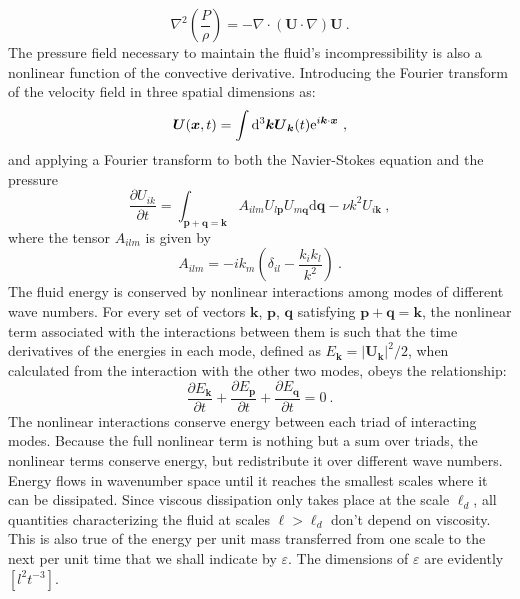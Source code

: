 \documentclass[12pt,a4paper]{article}
\renewcommand{\vec}[1]{\boldsymbol{#1}}
\newcommand{\dif}{\mathrm{d}}
\begin{document}
\begin{equation}
\nabla^2 \left(\frac{P}{\rho} \right) = -\nabla \cdot (\vec{U} \cdot \nabla) \vec{U} ~.
\end{equation}
The pressure field necessary to maintain the fluid's incompressibility is also a nonlinear function of the convective derivative. Introducing the Fourier transform of the velocity field in three spatial dimensions as:
\begin{equation}
\vec{U}(\vec{x}, t) = \int \dif^3 \vec{k} \vec{U}_{\vec{k}}(t) {\rm e}^{i\vec{k}\cdot \vec{x}} ~,
\end{equation}
and applying a Fourier transform to both the Navier-Stokes equation and the pressure
\begin{equation}
\dfrac{\partial U_{ik}}{\partial t} = \int_{\vec{p}+\vec{q}=\vec{k}} A_{ilm} U_{l\vec{p}} U_{m\vec{q}} \dif \vec{q} -\nu k^2 U_{i\vec{k}} ~,
\end{equation}
where the tensor $A_{ilm}$ is given by
\begin{equation*}
A_{ilm} = -ik_m \left(\delta_{il} -\dfrac{k_i k_l}{k^2} \right) ~.
\end{equation*}
The fluid energy is conserved by nonlinear interactions among modes of different wave numbers. For every set of vectors $\vec{k}$, $\vec{p}$, $\vec{q}$ satisfying $\vec{p} + \vec{q} = \vec{k}$, the nonlinear term associated with the interactions between them is such that the time derivatives of the energies in each mode, defined as $E_{\vec{k}} = |\vec{U}_{\vec{k}}|^2/2$, when calculated from the interaction with the other two modes, obeys the relationship:
\begin{equation*}
\dfrac{\partial E_{\vec{k}}}{\partial t} +\dfrac{\partial E_{\vec{p}}}{\partial t} +\dfrac{\partial E_{\vec{q}}}{\partial t} = 0 ~.
\end{equation*}
The nonlinear interactions conserve energy between each triad of interacting modes. Because the full nonlinear term is nothing but a sum over triads, the nonlinear terms conserve energy, but redistribute it over different wave numbers. Energy flows in wavenumber space until it reaches the smallest scales where it can be dissipated. Since viscous dissipation only takes place at the scale $\ell_d$, all quantities characterizing the fluid at scales $\ell > \ell_d$ don't depend on viscosity. This is also true of the energy per unit mass transferred from one scale to the next per unit time that we shall indicate by $\varepsilon$. The dimensions of $\varepsilon$ are evidently $[l^2 t^{-3}]$.
\end{document}
